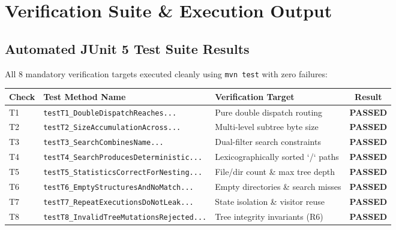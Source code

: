 \documentclass[11pt,a4paper]{article}
\begin{document}
\section{Verification Suite \& Execution Output}

\subsection{Automated JUnit 5 Test Suite Results}
All 8 mandatory verification targets executed cleanly using \texttt{mvn test} with zero failures:
\begin{center}
\footnotesize
\begin{tabular}{lp{6.8cm}p{5.2cm}c}
\toprule
\textbf{Check} & \textbf{Test Method Name} & \textbf{Verification Target} & \textbf{Result} \\
\midrule
T1 & \texttt{testT1\_DoubleDispatchReaches...} & Pure double dispatch routing & \textbf{PASSED} \\
T2 & \texttt{testT2\_SizeAccumulationAcross...} & Multi-level subtree byte size & \textbf{PASSED} \\
T3 & \texttt{testT3\_SearchCombinesName...} & Dual-filter search constraints & \textbf{PASSED} \\
T4 & \texttt{testT4\_SearchProducesDeterministic...} & Lexicographically sorted `/` paths & \textbf{PASSED} \\
T5 & \texttt{testT5\_StatisticsCorrectForNesting...} & File/dir count \& max tree depth & \textbf{PASSED} \\
T6 & \texttt{testT6\_EmptyStructuresAndNoMatch...} & Empty directories \& search misses & \textbf{PASSED} \\
T7 & \texttt{testT7\_RepeatExecutionsDoNotLeak...} & State isolation \& visitor reuse & \textbf{PASSED} \\
T8 & \texttt{testT8\_InvalidTreeMutationsRejected...} & Tree integrity invariants (R6) & \textbf{PASSED} \\
\bottomrule
\end{tabular}
\end{center}
\end{document}
